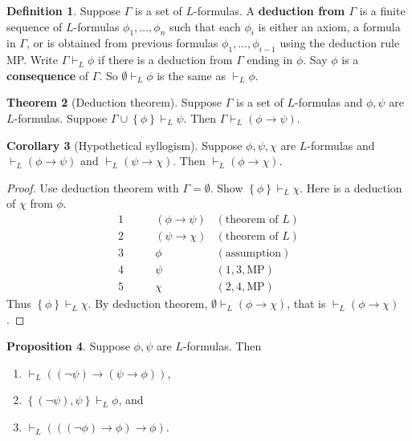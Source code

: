 \documentclass{article}
\newcommand{\rb}[1]{\left( #1 \right)}
\newcommand{\cb}[1]{\left\{ #1 \right\}}
\newcommand{\notb}[1]{\rb{\neg #1}}
\newcommand{\impb}[2]{\rb{#1 \rightarrow #2}}
\theoremstyle{definition}\newtheorem{definition}{Definition}[subsection]
\theoremstyle{definition}\newtheorem{remark}[definition]{Remark}
\theoremstyle{definition}\newtheorem*{example}{Example}
\theoremstyle{definition}\newtheorem*{note}{Note}
\newtheorem{proposition}[definition]{Proposition}
\newtheorem{theorem}[definition]{Theorem}
\newtheorem{corollary}[definition]{Corollary}
\begin{document}

\begin{definition}
Suppose $ \Gamma $ is a set of $ L $-formulas. A \textbf{deduction from $ \Gamma $} is a finite sequence of $ L $-formulas $ \phi_1, \dots, \phi_n $ such that each $ \phi_i $ is either an axiom, a formula in $ \Gamma $, or is obtained from previous formulas $ \phi_1, \dots, \phi_{i - 1} $ using the deduction rule MP. Write $ \Gamma \vdash_L \phi $ if there is a deduction from $ \Gamma $ ending in $ \phi $. Say $ \phi $ is a \textbf{consequence} of $ \Gamma $. So $ \emptyset \vdash_L \phi $ is the same as $ \vdash_L \phi $.
\end{definition}

\begin{theorem}[Deduction theorem]
\label{thm:1.2.5}
Suppose $ \Gamma $ is a set of $ L $-formulas and $ \phi, \psi $ are $ L $-formulas. Suppose $ \Gamma \cup \cb{\phi} \vdash_L \psi $. Then $ \Gamma \vdash_L \impb{\phi}{\psi} $.
\end{theorem}

\begin{corollary}[Hypothetical syllogism]
Suppose $ \phi, \psi, \chi $ are $ L $-formulas and $ \vdash_L \impb{\phi}{\psi} $ and $ \vdash_L \impb{\psi}{\chi} $. Then $ \vdash_L \impb{\phi}{\chi} $.
\end{corollary}

\begin{proof}
Use deduction theorem with $ \Gamma = \emptyset $. Show $ \cb{\phi} \vdash_L \chi $. Here is a deduction of $ \chi $ from $ \phi $.
\begin{align*}
1 \qquad & \impb{\phi}{\psi} & \rb{\text{theorem of } L} \\
2 \qquad & \impb{\psi}{\chi} & \rb{\text{theorem of } L} \\
3 \qquad & \phi & \rb{\text{assumption}} \\
4 \qquad & \psi & \rb{1, 3, \text{MP}} \\
5 \qquad & \chi & \rb{2, 4, \text{MP}}
\end{align*}
Thus $ \cb{\phi} \vdash_L \chi $. By deduction theorem, $ \emptyset \vdash_L \impb{\phi}{\chi} $, that is $ \vdash_L \impb{\phi}{\chi} $.
\end{proof}

\begin{proposition}
\label{prop:1.2.7}
Suppose $ \phi, \psi $ are $ L $-formulas. Then
\begin{enumerate}
\item $ \vdash_L \impb{\notb{\psi}}{\impb{\psi}{\phi}} $,
\item $ \cb{\notb{\psi}, \psi} \vdash_L \phi $, and
\item $ \vdash_L \impb{\impb{\notb{\phi}}{\phi}}{\phi} $.
\end{enumerate}
\end{proposition}
\end{document}
